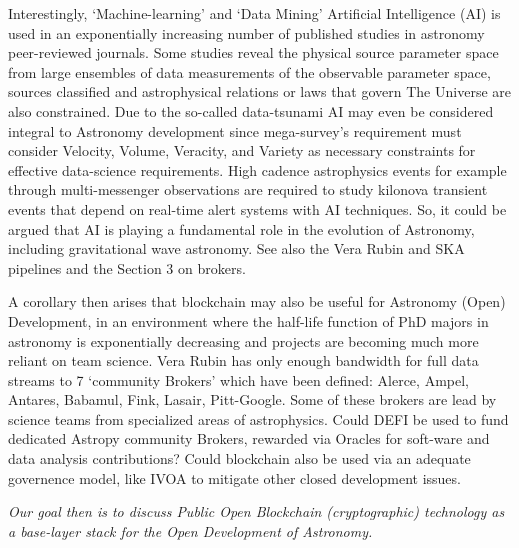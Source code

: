 \documentclass[final,5p,times,twocolumn,authoryear]{elsarticle}
\begin{document}
Interestingly,  `Machine-learning' and `Data Mining' Artificial Intelligence (AI) is used in an exponentially increasing number of published studies in astronomy peer-reviewed journals. Some studies reveal the physical source parameter space from large ensembles of data measurements of the observable parameter space, sources classified and astrophysical relations or laws that govern The Universe are also constrained. Due to the so-called data-tsunami AI may even be considered integral to Astronomy development since mega-survey's requirement must consider Velocity, Volume, Veracity, and Variety as necessary constraints for effective data-science requirements. High cadence astrophysics events for example through multi-messenger observations are required to study kilonova transient events that depend on real-time alert systems with AI techniques. So, it could be argued that AI is playing a fundamental role in the evolution of Astronomy, including gravitational wave astronomy. See also the Vera Rubin and SKA pipelines and the Section 3 on brokers. 

A corollary then arises that blockchain may also be useful for Astronomy (Open) Development, in an environment where the half-life function of PhD majors in astronomy is exponentially decreasing and projects are becoming much more reliant on team science.  Vera Rubin has only enough bandwidth for full data streams to 7 `community Brokers' which have been defined: Alerce, Ampel, Antares, Babamul, Fink, Lasair, Pitt-Google. Some of these brokers are lead by science teams from specialized areas of astrophysics. Could DEFI be used to fund dedicated Astropy community Brokers, rewarded via Oracles for soft-ware and data analysis contributions? Could blockchain also be used via an adequate governence model, like IVOA to mitigate other closed development issues.

\emph{Our goal then is to discuss Public Open Blockchain (cryptographic) technology as a base-layer stack for the Open Development of Astronomy.}
\end{document}
